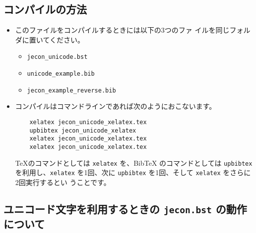 \documentclass[a4paper,10pt]{bxjsarticle}
\begin{document}
\subsection{コンパイルの方法}

\begin{itemize}
 \item このファイルをコンパイルするときには以下の3つのファ
       イルを同じフォルダに置いてください。
       \begin{itemize}
	\item \texttt{jecon\_unicode.bst}
	\item \texttt{unicode\_example.bib}
	\item \texttt{jecon\_example\_reverse.bib}
       \end{itemize}
 \item コンパイルはコマンドラインであれば次のようにおこないます。
\begin{verbatim}
    xelatex jecon_unicode_xelatex.tex
    upbibtex jecon_unicode_xelatex
    xelatex jecon_unicode_xelatex.tex               
    xelatex jecon_unicode_xelatex.tex
\end{verbatim}
       \TeX のコマンドとしては \texttt{xelatex} を、BibTeX のコマンドとしては
       \texttt{upbibtex} を利用し、\texttt{xelatex} を1回、次に
       \texttt{upbibtex} を1回、そして \texttt{xelatex} をさらに2回実行するとい
       うことです。
\end{itemize}

\subsection{ユニコード文字を利用するときの \texttt{jecon.bst} の動作について}
\end{document}
